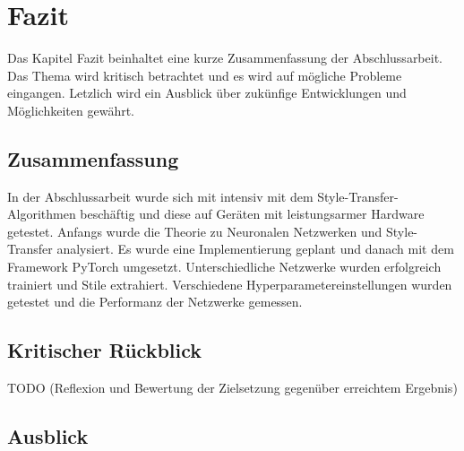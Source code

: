 \chapter{Fazit}

Das Kapitel Fazit beinhaltet eine kurze Zusammenfassung der Abschlussarbeit. Das Thema wird kritisch betrachtet und es wird auf mögliche Probleme eingangen.
Letzlich wird ein Ausblick über zukünfige Entwicklungen und Möglichkeiten gewährt.

\section{Zusammenfassung}

In der Abschlussarbeit wurde sich mit intensiv mit dem Style-Transfer-Algorithmen beschäftig und diese auf Geräten mit leistungsarmer Hardware getestet.
Anfangs wurde die Theorie zu Neuronalen Netzwerken und Style-Transfer analysiert. Es wurde eine Implementierung geplant und danach mit dem Framework PyTorch umgesetzt. Unterschiedliche Netzwerke wurden erfolgreich trainiert und Stile extrahiert. Verschiedene Hyperparametereinstellungen wurden getestet und die Performanz der Netzwerke gemessen.


\section{Kritischer Rückblick}

TODO (Reflexion und Bewertung der Zielsetzung gegenüber erreichtem Ergebnis)

\section{Ausblick}
